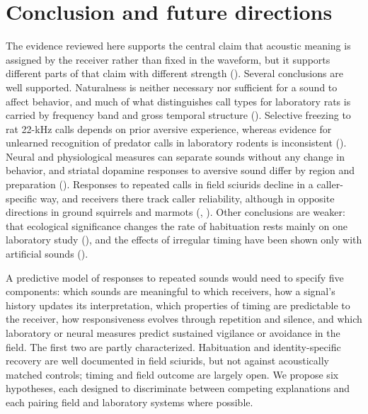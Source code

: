 \section{Conclusion and future directions}
\label{sec:conclusion}


The evidence reviewed here supports the central claim that acoustic meaning is assigned by the receiver rather than fixed in the waveform, but it supports different parts of that claim with different strength (). Several conclusions are well supported. Naturalness is neither necessary nor sufficient for a sound to affect behavior, and much of what distinguishes call types for laboratory rats is carried by frequency band and gross temporal structure (). Selective freezing to rat 22-kHz calls depends on prior aversive experience, whereas evidence for unlearned recognition of predator calls in laboratory rodents is inconsistent (). Neural and physiological measures can separate sounds without any change in behavior, and striatal dopamine responses to aversive sound differ by region and preparation (). Responses to repeated calls in field sciurids decline in a caller-specific way, and receivers there track caller reliability, although in opposite directions in ground squirrels and marmots (, ). Other conclusions are weaker: that ecological significance changes the rate of habituation rests mainly on one laboratory study (), and the effects of irregular timing have been shown only with artificial sounds ().

A predictive model of responses to repeated sounds would need to specify five components: which sounds are meaningful to which receivers, how a signal's history updates its interpretation, which properties of timing are predictable to the receiver, how responsiveness evolves through repetition and silence, and which laboratory or neural measures predict sustained vigilance or avoidance in the field. The first two are partly characterized. Habituation and identity-specific recovery are well documented in field sciurids, but not against acoustically matched controls; timing and field outcome are largely open. We propose six hypotheses, each designed to discriminate between competing explanations and each pairing field and laboratory systems where possible.


